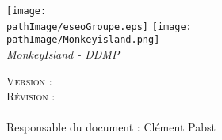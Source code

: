 
\makeatletter
	\begin{titlepage}
	\centering
    		\texttt{[image: \\pathImage/eseoGroupe.eps]}
    		\hfill
    		\hfill
    		\hfill
    		\hfill
    		\hfill
      	\hfill
    		\texttt{[image: \\pathImage/Monkeyisland.png]}
    \vspace{1cm}
    \vfill
    		{\Huge \textbf{\@title}} \\
    		\vspace{1em}
    		{\Large \textsl{MonkeyIsland - DDMP}}\\
    	\vspace{4em}
    	\begin{flushleft}
		{\LARGE \textsc{Version : \VersionDocument\\
			Révision : \RevisionDocument\\}
			\vspace{2em}	
        		\@author\\
        		Responsable du document : Clément Pabst\\		
		}    		
    		
    	\end{flushleft}

    		
    \vfill
	\end{titlepage}
\makeatother